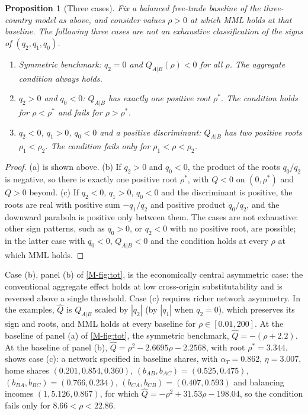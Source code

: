 \documentclass[11pt]{article}
\numberwithin{equation}{section}
\theoremstyle{plain}
\newtheorem{proposition}{Proposition}[section]
\begin{document}
\begin{proposition}[Three cases]
\label{prop:threecases}
Fix a balanced free-trade baseline of the three-country model as above, and consider values $\rho>0$ at which MML holds at that baseline. The following three cases are not an exhaustive classification of the signs of $(q_2,q_1,q_0)$.
\begin{enumerate}[label=(\alph*)]
\item Symmetric benchmark: $q_2=0$ and $Q_{A|B}(\rho)<0$ for all $\rho$. The aggregate condition always holds.
\item $q_2>0$ and $q_0<0$: $Q_{A|B}$ has exactly one positive root $\rho^*$. The condition holds for $\rho<\rho^*$ and fails for $\rho>\rho^*$.
\item $q_2<0$, $q_1>0$, $q_0<0$ and a positive discriminant: $Q_{A|B}$ has two positive roots $\rho_1<\rho_2$. The condition fails only for $\rho_1<\rho<\rho_2$.
\end{enumerate}
\end{proposition}

\begin{proof}
(a) is shown above. (b) If $q_2>0$ and $q_0<0$, the product of the roots $q_0/q_2$ is negative, so there is exactly one positive root $\rho^*$, with $Q<0$ on $(0,\rho^*)$ and $Q>0$ beyond. (c) If $q_2<0$, $q_1>0$, $q_0<0$ and the discriminant is positive, the roots are real with positive sum $-q_1/q_2$ and positive product $q_0/q_2$, and the downward parabola is positive only between them. The cases are not exhaustive: other sign patterns, such as $q_0>0$, or $q_2<0$ with no positive root, are possible; in the latter case with $q_0<0$, $Q_{A|B}<0$ and the condition holds at every $\rho$ at which MML holds.
\end{proof}

Case (b), panel (b) of \cref{M-fig:tot}, is the economically central asymmetric case: the conventional aggregate effect holds at low cross-origin substitutability and is reversed above a single threshold. Case (c) requires richer network asymmetry. In the examples, $\hat Q$ is $Q_{A|B}$ scaled by $|q_2|$ (by $|q_1|$ when $q_2=0$), which preserves its sign and roots, and MML holds at every baseline for $\rho\in[0.01,200]$. At the baseline of panel (a) of \cref{M-fig:tot}, the symmetric benchmark, $\hat Q=-(\rho+2.2)$. At the baseline of panel (b), $\hat Q=\rho^2-2.6695\rho-2.2568$, with root $\rho^*=3.344$.  shows case (c): a network specified in baseline shares, with $\alpha_T=0.862$, $\eta=3.007$, home shares $(0.201,0.854,0.360)$, $(b_{AB},b_{AC})=(0.525,0.475)$, $(b_{BA},b_{BC})=(0.766,0.234)$, $(b_{CA},b_{CB})=(0.407,0.593)$ and balancing incomes $(1,5.126,0.867)$, for which $\hat Q=-\rho^2+31.53\rho-198.04$, so the condition fails only for $8.66<\rho<22.86$.
\end{document}
